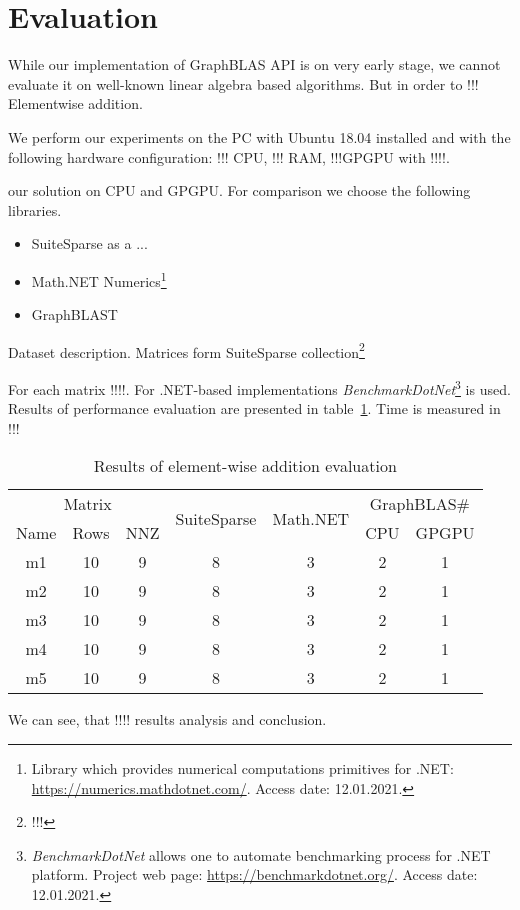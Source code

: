 \section{Evaluation}

While our implementation of GraphBLAS API is on very early stage, we cannot evaluate it on well-known linear algebra based algorithms. 
But in order to !!! Elementwise addition. 

We perform our experiments on the PC with Ubuntu 18.04 installed and with the following hardware configuration: !!! CPU, !!! RAM, !!!GPGPU with !!!!.

our solution on CPU and GPGPU.
For comparison we choose the following libraries.
\begin{itemize}
\item SuiteSparse as a ...
\item Math.NET Numerics\footnote{Library which provides numerical computations primitives for .NET: \url{https://numerics.mathdotnet.com/}. Access date: 12.01.2021.}
\item GraphBLAST
\end{itemize}



Dataset description. Matrices form SuiteSparse collection\footnote{!!!}

For each matrix !!!!.
For .NET-based implementations \textit{BenchmarkDotNet}\footnote{\textit{BenchmarkDotNet} allows one to automate benchmarking process for .NET platform. Project web page: \url{https://benchmarkdotnet.org/}. Access date: 12.01.2021.} is used.
Results of performance evaluation are presented in table~\ref{tbl_results}.
Time is measured in !!!

\begin{table}
\caption{Results of element-wise addition evaluation}
\label{tbl_results}
\begin{center}
\begin{tabular}{|c|c|c|c|c|c|c|}
\hline
\multicolumn{3}{|c|}{Matrix} & \multirow{2}{5em}{SuiteSparse} & \multirow{2}{4em}{Math.NET} & \multicolumn{2}{|c|}{GraphBLAS\#} \\
Name & Rows & NNZ            &                                &                             & CPU & GPGPU \\ 
\hline
\hline
m1     & 10          & 9        & 8     & 3& 2 & 1      \\ 
m2     & 10          & 9        & 8     & 3& 2 & 1      \\ 
m3     & 10          & 9        & 8     & 3& 2 & 1      \\ 
m4     & 10          & 9        & 8     & 3& 2 & 1      \\ 
m5     & 10          & 9        & 8     & 3& 2 & 1      \\ 
\hline
\end{tabular}
\end{center}
\end{table}

We can see, that !!!! results analysis and conclusion.
